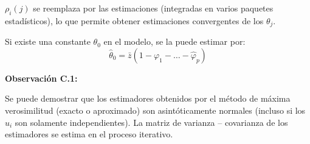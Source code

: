 $\rho_{i} (j)$ se reemplaza por las estimaciones (integradas en varios paquetes estad\'{i}sticos), lo que permite obtener estimaciones convergentes de los $\theta_{j}$.\newline

Si existe una constante $\theta_{0}$ en el modelo, se la puede estimar por:
\[
\hat{\theta}_{0} =\bar{z}(1-\varphi_{1} -\ldots -\hat{\varphi}_{p} )
\]

\textbf{Observaci\'{o}n C.1:}

Se puede demostrar que los estimadores obtenidos por el m\'{e}todo de m\'{a}xima verosimilitud (exacto o aproximado) son asint\'{o}ticamente normales (incluso si los $u_{i}$ son solamente independientes). La matriz de varianza -- covarianza de los estimadores se estima en el proceso iterativo.
